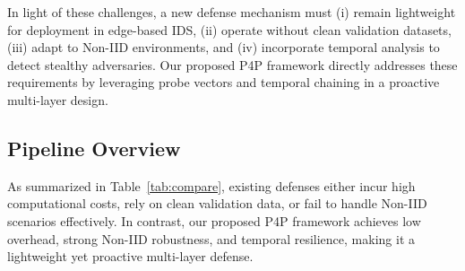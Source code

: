 In light of these challenges, a new defense mechanism must (i) remain lightweight for deployment in edge-based IDS, (ii) operate without clean validation datasets, (iii) adapt to Non-IID environments, and (iv) incorporate temporal analysis to detect stealthy adversaries. Our proposed P4P framework directly addresses these requirements by leveraging probe vectors and temporal chaining in a proactive multi-layer design.

\subsection{Pipeline Overview}

As summarized in Table~\ref{tab:compare}, existing defenses either incur
high computational costs, rely on clean validation data, or fail to handle
Non-IID scenarios effectively. In contrast, our proposed P4P framework
achieves low overhead, strong Non-IID robustness, and temporal resilience,
making it a lightweight yet proactive multi-layer defense.




